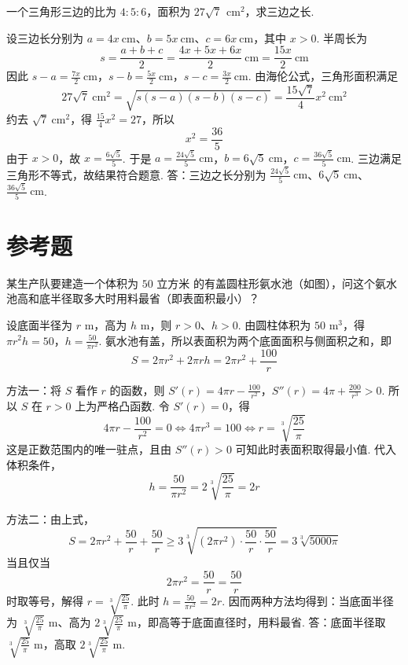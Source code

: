 \begin{problem}
一个三角形三边的比为 \(4:5:6\)，面积为 \(27\sqrt{7}\,\mathrm{~cm}^2\)，求三边之长.
\end{problem}

\begin{solution}
设三边长分别为 \(a=4x\mathrm{~cm}\)、\(b=5x\mathrm{~cm}\)、\(c=6x\mathrm{~cm}\)，其中 \(x>0\). 半周长为
\[
s=\frac{a+b+c}{2}=\frac{4x+5x+6x}{2}\mathrm{~cm}=\frac{15x}{2}\mathrm{~cm}
\]
因此
\(s-a=\frac{7x}{2}\mathrm{~cm}\)，\(s-b=\frac{5x}{2}\mathrm{~cm}\)，\(s-c=\frac{3x}{2}\mathrm{~cm}\).
由海伦公式，三角形面积满足
\[
27\sqrt{7}\mathrm{~cm}^2
=\sqrt{s\left(s-a\right)\left(s-b\right)\left(s-c\right)}
=\frac{15\sqrt{7}}{4}x^2\mathrm{~cm}^2
\]
约去 \(\sqrt{7}\mathrm{~cm}^2\)，得 \(\frac{15}{4}x^2=27\)，所以
\[
x^2=\frac{36}{5}
\]
由于 \(x>0\)，故 \(x=\frac{6\sqrt{5}}{5}\). 于是
\(a=\frac{24\sqrt{5}}{5}\mathrm{~cm}\)，\(b=6\sqrt{5}\mathrm{~cm}\)，\(c=\frac{36\sqrt{5}}{5}\mathrm{~cm}\).
三边满足三角形不等式，故结果符合题意. 答：三边之长分别为 \(\frac{24\sqrt{5}}{5}\mathrm{~cm}\)、\(6\sqrt{5}\mathrm{~cm}\)、\(\frac{36\sqrt{5}}{5}\mathrm{~cm}\).
\end{solution}

\section{参考题}

\begin{problem}
某生产队要建造一个体积为 \(50\text{~立方米}\) 的有盖圆柱形氨水池（如图），问这个氨水池高和底半径取多大时用料最省（即表面积最小）？

\end{problem}

\begin{solution}
设底面半径为 \(r\text{~m}\)，高为 \(h\text{~m}\)，则 \(r>0\)、\(h>0\). 由圆柱体积为 \(50\text{~m}^3\)，得
\(\pi r^2h=50\)，\(h=\frac{50}{\pi r^2}\).
氨水池有盖，所以表面积为两个底面面积与侧面积之和，即
\[
S=2\pi r^2+2\pi rh
=2\pi r^2+\frac{100}{r}
\]

方法一：将 \(S\) 看作 \(r\) 的函数，则
\(S'(r)=4\pi r-\frac{100}{r^2}\)，\(S''(r)=4\pi+\frac{200}{r^3}>0\).
所以 \(S\) 在 \(r>0\) 上为严格凸函数. 令 \(S'(r)=0\)，得
\[
4\pi r-\frac{100}{r^2}=0
\Longleftrightarrow
4\pi r^3=100
\Longleftrightarrow
r=\sqrt[3]{\frac{25}{\pi}}
\]
这是正数范围内的唯一驻点，且由 \(S''(r)>0\) 可知此时表面积取得最小值. 代入体积条件，
\[
h=\frac{50}{\pi r^2}=2\sqrt[3]{\frac{25}{\pi}}=2r
\]

方法二：由上式，
\[
S=2\pi r^2+\frac{50}{r}+\frac{50}{r}
\geqslant3\sqrt[3]{\left(2\pi r^2\right)\cdot\frac{50}{r}\cdot\frac{50}{r}}
=3\sqrt[3]{5000\pi}
\]
当且仅当
\[
2\pi r^2=\frac{50}{r}=\frac{50}{r}
\]
时取等号，解得 \(r=\sqrt[3]{\frac{25}{\pi}}\). 此时 \(h=\frac{50}{\pi r^2}=2r\). 因而两种方法均得到：当底面半径为 \(\sqrt[3]{\frac{25}{\pi}}\text{~m}\)、高为 \(2\sqrt[3]{\frac{25}{\pi}}\text{~m}\)，即高等于底面直径时，用料最省. 答：底面半径取 \(\sqrt[3]{\frac{25}{\pi}}\text{~m}\)，高取 \(2\sqrt[3]{\frac{25}{\pi}}\text{~m}\).
\end{solution}

